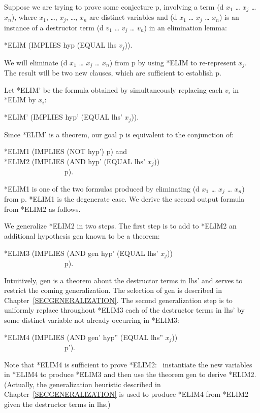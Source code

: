 \documentclass[10pt]{book}
\newenvironment{pubasis}{\begin{flushleft}}{\end{flushleft}}
\begin{document}
Suppose we are trying to prove some conjecture p,
involving a term (d $x_{1}$ \ldots{} $x_{j}$ \ldots{} $x_{n}$), where
$x_{1}$, \ldots{}, $x_{j}$, \ldots{}, $x_{n}$ are distinct variables
and (d $x_{1}$ \ldots{} $x_{j}$ \ldots{} $x_{n}$) is an instance of a
destructor term (d $v_{1}$ \ldots{} $v_{j}$ \ldots{} $v_{n}$) in
an elimination lemma:
\begin{pubasis}
*ELIM	(IMPLIES hyp (EQUAL lhs $v_{j}$)).\\
\end{pubasis}
We will eliminate (d $x_{1}$ \ldots{} $x_{j}$ \ldots{} $x_{n}$)
from p by using *ELIM to re-represent $x_{j}$.
The result will be two new clauses, which are
sufficient to establish p.

Let *ELIM' be the formula obtained by simultaneously
replacing each $v_{i}$ in *ELIM by $x_{i}$:
\begin{pubasis}
*ELIM'	(IMPLIES hyp' (EQUAL lhs' $x_{j}$)).\\
\end{pubasis}
Since *ELIM' is a theorem, our goal p is equivalent
to the conjunction of:
\begin{pubasis}
*ELIM1	(IMPLIES (NOT hyp') p) and\\

*ELIM2	(IMPLIES (AND hyp' (EQUAL lhs' $x_{j}$))\\
~~~~~~~~~~~~~~~~~p).\\
\end{pubasis}
*ELIM1 is one of the two formulas produced by  eliminating
(d $x_{1}$ \ldots{} $x_{j}$ \ldots{} $x_{n}$) from p.  *ELIM1 is the
degenerate case.  We derive the second output formula
from *ELIM2 as follows.

We generalize *ELIM2 in two steps.  The first step
is to add to *ELIM2 an additional hypothesis
gen known to be a theorem:
\begin{pubasis}
*ELIM3	(IMPLIES (AND gen hyp' (EQUAL lhs' $x_{j}$))\\
~~~~~~~~~~~~~~~~~p).\\
\end{pubasis}
Intuitively, gen is a theorem about the destructor
terms in lhs' and serves to restrict the coming generalization.
The selection of gen is described in Chapter~\ref{SECGENERALIZATION}.
The second generalization step is to uniformly replace
throughout *ELIM3 each of the destructor terms in lhs'
by some distinct variable not already occurring in
*ELIM3:
\begin{pubasis}
*ELIM4	(IMPLIES (AND gen' hyp'' (EQUAL lhs'' $x_{j}$))\\
~~~~~~~~~~~~~~~~~p').\\
\end{pubasis}
Note that *ELIM4 is sufficient to prove *ELIM2:~
instantiate the new variables in *ELIM4 to produce
*ELIM3 and then use the theorem gen to derive
*ELIM2.  (Actually, the generalization heuristic
described in Chapter~\ref{SECGENERALIZATION} is used to produce
*ELIM4 from *ELIM2 given the destructor terms
in lhs.) 
\end{document}

